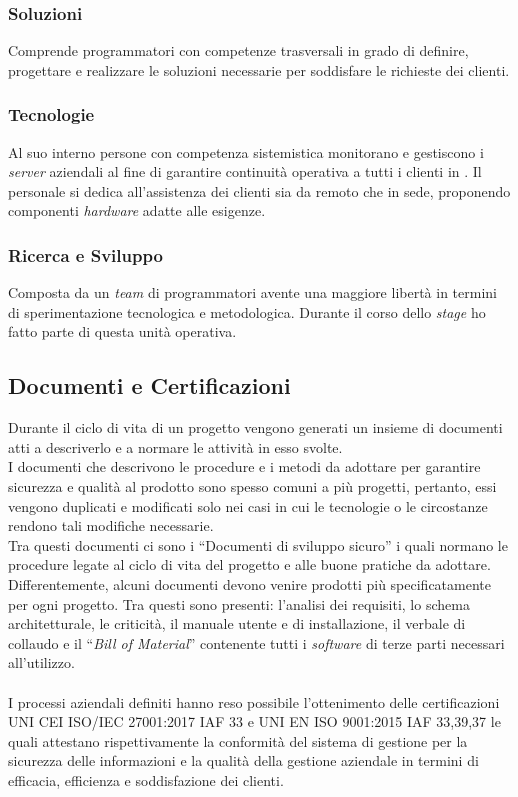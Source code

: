 \subsubsection*{Soluzioni}
Comprende programmatori con competenze trasversali in grado di definire, progettare e realizzare le soluzioni necessarie per soddisfare le richieste dei clienti. 

\subsubsection*{Tecnologie}
Al suo interno persone con competenza sistemistica monitorano e gestiscono i \emph{server} aziendali al fine di garantire continuità operativa a tutti i clienti in . Il personale si dedica all'assistenza dei clienti sia da remoto che in sede, proponendo componenti \emph{hardware} adatte alle esigenze. 

\subsubsection*{Ricerca e Sviluppo}
Composta da un \emph{team} di programmatori avente una maggiore libertà in termini di sperimentazione tecnologica e metodologica. Durante il corso dello \emph{stage} ho fatto parte di questa \gls{unità operativa}. 

\subsection{Documenti e Certificazioni}
Durante il ciclo di vita di un progetto vengono generati un insieme di documenti atti a descriverlo e a normare le attività in esso svolte.\\
I documenti che descrivono le procedure e i metodi da adottare per garantire sicurezza e qualità al prodotto sono spesso comuni a più progetti, pertanto, essi vengono duplicati e modificati solo nei casi in cui le tecnologie o le circostanze rendono tali modifiche necessarie.\\
Tra questi documenti ci sono i “Documenti di sviluppo sicuro” i quali normano le procedure legate al ciclo di vita del progetto e alle buone pratiche da adottare.\\ 
Differentemente, alcuni documenti devono venire prodotti più specificatamente per ogni progetto. Tra questi sono presenti: l'analisi dei requisiti, lo schema architetturale, le criticità, il manuale utente e di installazione, il verbale di collaudo e il “\emph{Bill of Material}” contenente tutti i \emph{software} di terze parti necessari all'utilizzo.\\\\
I processi aziendali definiti hanno reso possibile l'ottenimento delle certificazioni UNI CEI ISO/IEC 27001:2017 IAF 33 e UNI EN ISO 9001:2015 IAF 33,39,37 le quali attestano rispettivamente la conformità del sistema di gestione per la sicurezza delle informazioni e la qualità della gestione aziendale in termini di efficacia, efficienza e soddisfazione dei clienti. 


